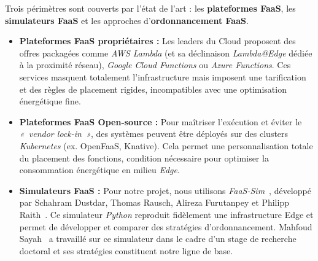 Trois périmètres sont couverts par l'état de l'art : les \textbf{plateformes FaaS}, les \textbf{simulateurs FaaS} et les approches d'\textbf{ordonnancement FaaS}.

\begin{itemize}
    \item \textbf{Plateformes FaaS propriétaires :} Les leaders du Cloud proposent des offres packagées comme \textit{AWS Lambda} (et sa déclinaison \textit{Lambda@Edge} dédiée à la proximité réseau), \textit{Google Cloud Functions} ou \textit{Azure Functions}. Ces services masquent totalement l'infrastructure mais imposent une tarification et des règles de placement rigides, incompatibles avec une optimisation énergétique fine.
    \item \textbf{Plateformes FaaS Open-source :} Pour maîtriser l'exécution et éviter le \textit{«~vendor lock-in~»}, des systèmes peuvent être déployés sur des clusters \textit{Kubernetes} (ex. OpenFaaS, Knative). Cela permet une personnalisation totale du placement des fonctions, condition nécessaire pour optimiser la consommation énergétique en milieu \textit{Edge}.
    \item \textbf{Simulateurs FaaS :} Pour notre projet, nous utilisons \textit{FaaS-Sim}~\cite{philipp_raith_faas}, développé par Schahram Dustdar, Thomas Rausch, Alireza Furutanpey et Philipp Raith~\cite{philipp_raith}. Ce simulateur \textit{Python} reproduit fidèlement une infrastructure Edge et permet de développer et comparer des stratégies d'ordonnancement. Mahfoud Sayah~\cite{mahfoud} a travaillé sur ce simulateur dans le cadre d'un stage de recherche doctoral et ses stratégies constituent notre ligne de base.
\end{itemize}
